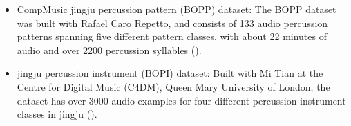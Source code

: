 \begin{itemize}[leftmargin=*]
	\item CompMusic \Gls{jingju} percussion pattern (\acrshort{BOPP}) dataset: The \acrshort{BOPP} dataset was built with Rafael Caro Repetto, and consists of 133 audio percussion patterns spanning five different pattern classes, with about 22 minutes of audio and over 2200 percussion syllables (). 
	\item \Gls{jingju} percussion instrument (\acrshort{BOPI}) dataset: Built with Mi Tian at the Centre for Digital Music (C4DM), Queen Mary University of London, the dataset has over 3000 audio examples for four different percussion instrument classes in \gls{jingju} (). 
\end{itemize}

